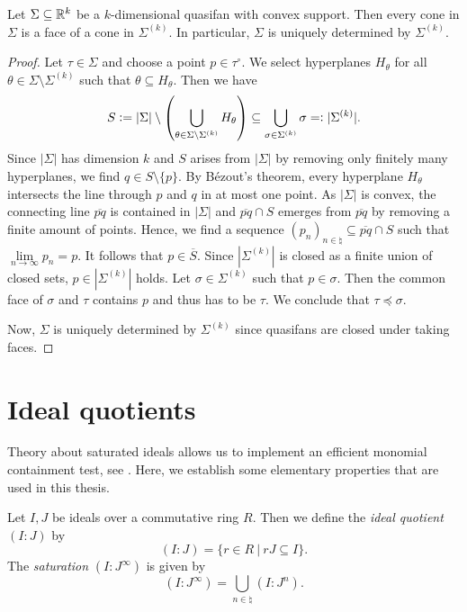 \begin{lemmaApp}
	\label{lemma:convex_fan_maximal_cones}
	Let $\Sigma\subseteq\mathbb{R}^k$ be a $k$-dimensional quasifan with convex support. Then every cone in $\Sigma$ is a face of a cone in $\Sigma^{(k)}$. In particular, $\Sigma$ is uniquely determined by $\Sigma^{(k)}$.
\end{lemmaApp}
\begin{proof}
	Let $\tau\in\Sigma$ and choose a point $p\in\tau^\circ$. We select hyperplanes $H_\theta$ for all $\theta\in\Sigma\setminus\Sigma^{(k)}$ such that $\theta\subseteq H_\theta$. Then we have
	$$S \mathrel{\mathop:}= |\Sigma| \setminus \left(\bigcup_{\theta\in\Sigma\setminus\Sigma^{(k)}} H_\theta\right) \subseteq \bigcup_{\sigma\in\Sigma^{(k)}} \sigma =\mathrel{\mathop:} |\Sigma^{(k)}|.$$
	Since $|\Sigma|$ has dimension $k$ and $S$ arises from $|\Sigma|$ by removing only finitely many hyperplanes, we find $q\in S \setminus\{p\}$. By Bézout's theorem, every hyperplane $H_\theta$ intersects the line through $p$ and $q$ in at most one point. As $|\Sigma|$ is convex, the connecting line $\overline{pq}$ is contained in $|\Sigma|$ and $\overline{pq} \cap S$ emerges from $\overline{pq}$ by removing a finite amount of points. Hence, we find a sequence $(p_n)_{n\in\natural}\subseteq \overline{pq} \cap S$ such that $\lim\limits_{n\rightarrow\infty} p_n = p$. It follows that $p\in\overline{S}$. Since $|\Sigma^{(k)}|$ is closed as a finite union of closed sets, $p\in|\Sigma^{(k)}|$ holds. Let $\sigma\in\Sigma^{(k)}$ such that $p\in\sigma$. Then the common face of $\sigma$ and $\tau$ contains $p$ and thus has to be $\tau$. We conclude that $\tau\preceq\sigma$.
	
	Now, $\Sigma$ is uniquely determined by $\Sigma^{(k)}$ since quasifans are closed under taking faces.
\end{proof}

\chapter{Ideal quotients}
\label{appendix:ideal_quotients}

Theory about saturated ideals allows us to implement an efficient monomial containment test, see \cite{gitfan_symmetry}. Here, we establish some elementary properties that are used in this thesis.

\begin{defiApp}
	Let $I,J$ be ideals over a commutative ring $R$. Then we define the \emph{ideal quotient} $(I:J)$ by
	$$(I:J) = \{r\in R\ |\ rJ\subseteq I\}.$$
	The \emph{saturation} $(I:J^\infty)$ is given by
	$$(I:J^\infty) = \bigcup_{n\in \natural}(I:J^n).$$
\end{defiApp}

